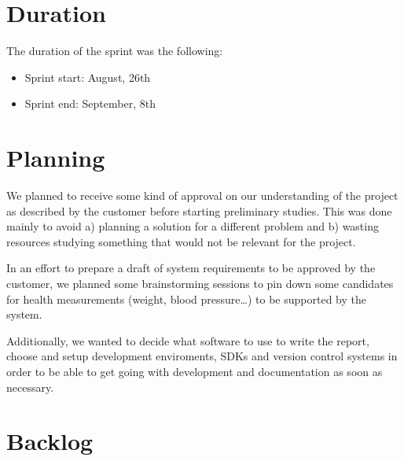 \section{Duration}
The duration of the sprint was the following:
\begin{itemize}
\item Sprint start: August, 26th
\item Sprint end: September, 8th
\end{itemize}

\section{Planning}

We planned to receive some kind of approval on our understanding of the project
as described by the customer before starting preliminary studies. This was done mainly to avoid
a) planning a solution for a different problem and
b) wasting resources studying something that would not be relevant for the project.

In an effort to prepare a draft of system requirements to be approved by the customer,
we planned some brainstorming sessions to pin down some candidates for health measurements
(weight, blood pressure\ldots) to be supported by the system.

Additionally, we wanted to decide what software to use to write the report,
choose and setup development enviroments, SDKs and version control systems in order to be able
to get going with development and documentation as soon as necessary.

\newpage
\section{Backlog}

